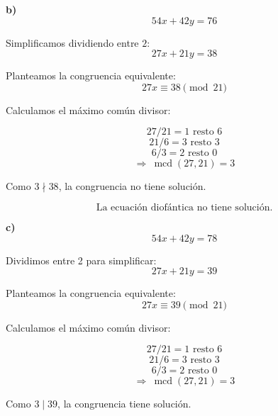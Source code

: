 \documentclass[a4paper,12pt]{article}
\begin{document}
\begin{ejercicio}[title=Ejercicio 33]

\textbf{b)} \\[0.3em]
\[
54x + 42y = 76
\]

Simplificamos dividiendo entre $2$:
\[
27x + 21y = 38
\]

Planteamos la congruencia equivalente:
\[
27x \equiv 38 \pmod{21}
\]

Calculamos el máximo común divisor:

\[
27 / 21 = 1 \text{ resto } 6
\]
\[
21 / 6 = 3 \text{ resto } \boxed{3}
\]
\[
6 / 3 = 2 \text{ resto } 0
\]
\[
\Rightarrow \ \operatorname{mcd}(27,21) = \boxed{3}
\]

Como $3 \nmid 38$, la congruencia no tiene solución.

\[
\boxed{\text{La ecuación diofántica no tiene solución.}}
\]

\vspace{1em}

\textbf{c)} \\[0.3em]
\[
54x + 42y = 78
\]

Dividimos entre 2 para simplificar:
\[
27x + 21y = 39
\]

Planteamos la congruencia equivalente:
\[
27x \equiv 39 \pmod{21}
\]

Calculamos el máximo común divisor:

\[
27 / 21 = 1 \text{ resto } 6
\]
\[
21 / 6 = 3 \text{ resto } \boxed{3}
\]
\[
6 / 3 = 2 \text{ resto } 0
\]
\[
\Rightarrow \ \operatorname{mcd}(27,21) = \boxed{3}
\]

Como $3 \mid 39$, la congruencia tiene solución.

\end{ejercicio}
\end{document}
